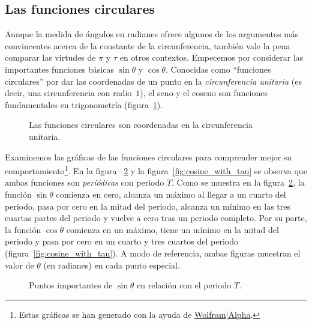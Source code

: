  \subsection{Las funciones circulares} %
  \label{sec:the_circle_functions}

Aunque la medida de ángulos en radianes ofrece algunos de los argumentos más convincentes acerca de la constante de la circunferencia, también vale la pena comparar las virtudes de $\pi$ y $\tau$ en otros contextos. Empecemos por considerar las importantes funciones básicas $\sin\theta$ y $\cos\theta$. Conocidas como ``funciones circulares'' por dar las coordenadas de un punto en la \emph{circunferencia unitaria} (es decir, una circunferencia con radio~$1$), el seno y el coseno son funciones fundamentales en trigonometría (figura~\ref{fig:circle_functions}).

\begin{figure}
\begin{center}
\end{center}
\caption{Las funciones circulares son coordenadas en la circunferencia unitaria.\label{fig:circle_functions}}
\end{figure}

Examinemos las gráficas de las funciones circulares para comprender mejor su comportamiento\footnote{Estas gráficas se han generado con la ayuda de \href{http://www.wolframalpha.com/}{Wolfram|Alpha}.}. En la figura ~\ref{fig:sine_with_tau} y la figura~\ref{fig:cosine_with_tau} se observa que ambas funciones son \emph{periódicas} con periodo $T$. Como se muestra en la figura~\ref{fig:sine_with_tau}, la función $\sin\theta$ comienza en cero, alcanza un máximo al llegar a un cuarto del periodo, pasa por cero en la mitad del periodo, alcanza un mínimo en las tres cuartas partes del periodo y vuelve a cero tras un periodo completo. Por su parte, la función $\cos\theta$ comienza en un máximo, tiene un mínimo en la mitad del periodo y pasa por cero en un cuarto y tres cuartos del periodo (figura~\ref{fig:cosine_with_tau}). A modo de referencia, ambas figuras muestran el valor de $\theta$ (en radianes) en cada punto especial.

\begin{figure}
\begin{center}
\end{center}
\caption{Puntos importantes de $\sin\theta$ en relación con el periodo $T$.\label{fig:sine_with_tau}}
\end{figure}

